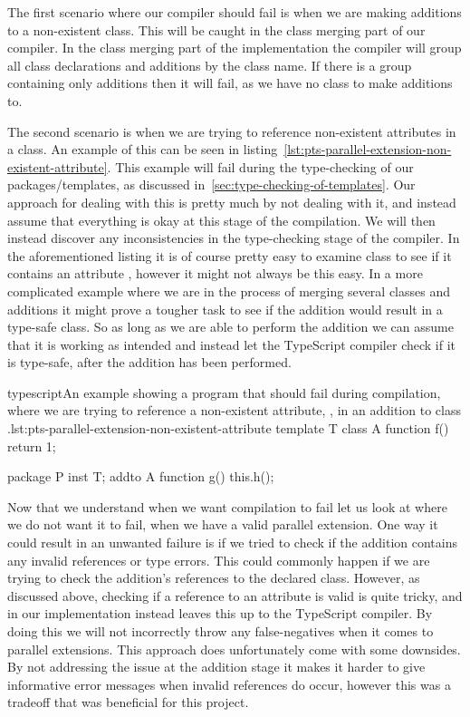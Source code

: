 The first scenario where our compiler should fail is when we are making additions to a non-existent class.
This will be caught in the class merging part of our compiler.
In the class merging part of the implementation the compiler will group all class declarations and additions by the class name.
If there is a group containing only additions then it will fail, as we have no class to make additions to.

The second scenario is when we are trying to reference non-existent attributes in a class.
An example of this can be seen in listing~\vref{lst:pts-parallel-extension-non-existent-attribute}.
This example will fail during the type-checking of our packages/templates, as discussed in~\vref{sec:type-checking-of-templates}.
Our approach for dealing with this is pretty much by not dealing with it, and instead assume that everything is okay at this stage of the compilation.
We will then instead discover any inconsistencies in the type-checking stage of the compiler.
In the aforementioned listing it is of course pretty easy to examine class  to see if it contains an attribute , however it might not always be this easy.
In a more complicated example where we are in the process of merging several classes and additions it might prove a tougher task to see if the addition would result in a type-safe class.
So as long as we are able to perform the addition we can assume that it is working as intended and instead let the TypeScript compiler check if it is type-safe, after the addition has been performed.

\begin{code}{typescript}{An example showing a program that should fail during compilation, where we are trying to reference a non-existent attribute, , in an addition to class .}{lst:pts-parallel-extension-non-existent-attribute}
    template T {
        class A {
            function f() {
                return 1;
            }
        }
    }

    package P {
        inst T;
        addto A {
            function g() {
                this.h();
            }
        }
    }
\end{code}

Now that we understand when we want compilation to fail let us look at where we do not want it to fail, when we have a valid parallel extension.
One way it could result in an unwanted failure is if we tried to check if the addition contains any invalid references or type errors.
This could commonly happen if we are trying to check the addition's references to the declared class.
However, as discussed above, checking if a reference to an attribute is valid is quite tricky, and in our implementation instead leaves this up to the TypeScript compiler.
By doing this we will not incorrectly throw any false-negatives when it comes to parallel extensions.
This approach does unfortunately come with some downsides.
By not addressing the issue at the addition stage it makes it harder to give informative error messages when invalid references do occur, however this was a tradeoff that was beneficial for this project.


